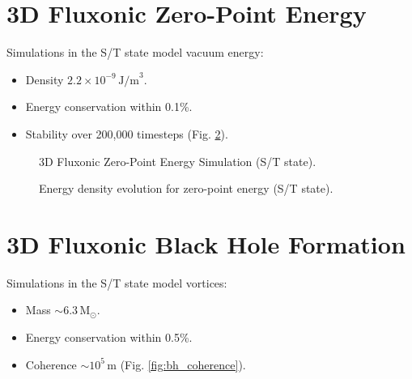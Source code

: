 \documentclass[11pt]{article}
\begin{document}
\section{3D Fluxonic Zero-Point Energy}
Simulations in the S/T state model vacuum energy:
\begin{itemize}
    \item Density \(2.2 \times 10^{-9} \, \text{J/m}^3\).
    \item Energy conservation within 0.1\%.
    \item Stability over 200,000 timesteps (Fig. \ref{fig:vac_energy}).
\end{itemize}

\begin{figure}[ht]
    \centering
    \caption{3D Fluxonic Zero-Point Energy Simulation (S/T state).}
    \label{fig:3Dvac}
\end{figure}

\begin{figure}[ht]
    \centering
    \caption{Energy density evolution for zero-point energy (S/T state).}
    \label{fig:vac_energy}
\end{figure}

\section{3D Fluxonic Black Hole Formation}
Simulations in the S/T state model vortices:
\begin{itemize}
    \item Mass \(\sim 6.3 \, \text{M}_\odot\).
    \item Energy conservation within 0.5\%.
    \item Coherence \(\sim 10^5 \, \text{m}\) (Fig. \ref{fig:bh_coherence}).
\end{itemize}
\end{document}
